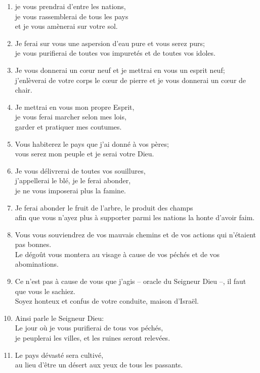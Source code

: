 \begin{enumerate}[leftmargin=\psleftmargin, labelsep = \pslabelsep, label={\arabic*}, font=\color{\pscolor}\small\textsuperscript, parsep=0em, itemsep=0em, topsep=0em ]
    \item je vous prendrai d’entre les nations, \\ je vous rassemblerai de tous les pays \\ et je vous amènerai sur votre sol.
    \item Je ferai sur vous une aspersion d’eau pure et vous serez purs; \\ je vous purifierai de toutes vos impuretés et de toutes vos idoles.
    \item Je vous donnerai un cœur neuf et je mettrai en vous un esprit neuf; \\ j’enlèverai de votre corps le cœur de pierre et je vous donnerai un cœur de chair.
    \item Je mettrai en vous mon propre Esprit, \\ je vous ferai marcher selon mes lois, \\ garder et pratiquer mes coutumes.
    \item Vous habiterez le pays que j’ai donné à vos pères; \\ vous serez mon peuple et je serai votre Dieu.
    \item Je vous délivrerai de toutes vos souillures, \\ j’appellerai le blé, je le ferai abonder, \\ je ne vous imposerai plus la famine.
    \item Je ferai abonder le fruit de l’arbre, le produit des champs \\ afin que vous n’ayez plus à supporter parmi les nations la honte d’avoir faim.
    \item Vous vous souviendrez de vos mauvais chemins et de vos actions qui n’étaient pas bonnes. \\ Le dégoût vous montera au visage à cause de vos péchés et de vos abominations.
    \item Ce n’est pas à cause de vous que j’agis – oracle du Seigneur Dieu –, il faut que vous le sachiez. \\ Soyez honteux et confus de votre conduite, maison d’Israël. \parSpace
    \item Ainsi parle le Seigneur Dieu: \\ Le jour où je vous purifierai de tous vos péchés, \\ je peuplerai les villes, et les ruines seront relevées.
    \item Le pays dévasté sera cultivé, \\ au lieu d’être un désert aux yeux de tous les passants.

\end{enumerate}
